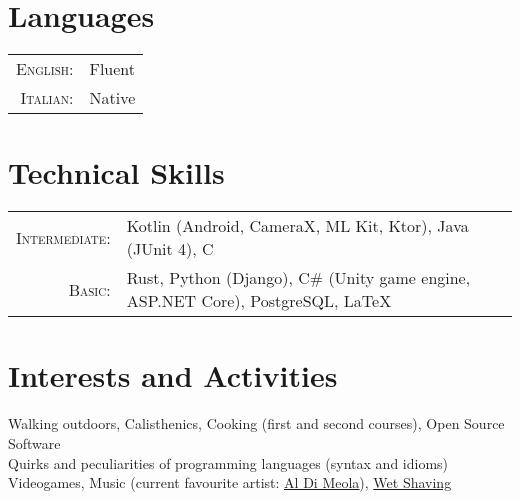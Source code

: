 \documentclass[a4paper,10pt]{article} %
\begin{document}

\section{Languages}

\begin{tabular}{rl}
\textsc{English:} & Fluent\\
\textsc{Italian:} & Native\\
\end{tabular}


\section{Technical Skills}

\begin{tabular}{rl}
\textsc{Intermediate:} & Kotlin \footnotesize(Android, CameraX, ML Kit, Ktor)\normalsize, Java \footnotesize(JUnit 4)\normalsize, C\\
\textsc{Basic:} & Rust, Python \footnotesize(Django)\normalsize, C\# \footnotesize(Unity game engine, ASP.NET Core)\normalsize, PostgreSQL, {\sffamily\LaTeX}\setmainfont[SmallCapsFont=Fontin SmallCaps]{Fontin-Regular}\\

\end{tabular}


\section{Interests and Activities}

Walking outdoors, Calisthenics, Cooking \footnotesize(first and second courses)\normalsize, Open Source Software\\
Quirks and peculiarities of programming languages \footnotesize(syntax and idioms)\normalsize\\
Videogames, Music \footnotesize(current favourite artist: \href{https://youtu.be/tsmThCBkBUo}{\underline{Al Di Meola}})\normalsize, \href{https://youtu.be/NRf48k8f-Yc}{\underline{Wet Shaving}}

\end{document}
